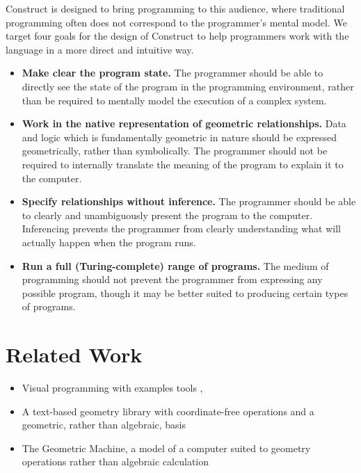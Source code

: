\documentclass[twoside,openright,11pt]{report}
\begin{document}
Construct is designed to bring programming to this audience, where traditional programming often does not correspond to the programmer's mental model.
We target four goals for the design of Construct to help programmers work with the language in a more direct and intuitive way.

\newcommand{\constructgoalsclear}{Make clear the program state}
\newcommand{\constructgoalsnative}{Work in the native representation of geometric relationships}
\newcommand{\constructgoalsnoinfer}{Specify relationships without inference}
\newcommand{\constructgoalscomplete}{Run a full (Turing-complete) range of programs}

\begin{itemize}
  \item {\bf \constructgoalsclear.} 
        The programmer should be able to directly see the state of the program in the programming environment, rather than be required to mentally model the execution of a complex system.
  \item {\bf \constructgoalsnative.} 
        Data and logic which is fundamentally geometric in nature should be expressed geometrically, rather than symbolically. 
        The programmer should not be required to internally translate the meaning of the program to explain it to the computer.
  \item {\bf \constructgoalsnoinfer.} 
        The programmer should be able to clearly and unambiguously present the program to the computer. 
        Inferencing prevents the programmer from clearly understanding what will actually happen when the program runs.
  \item {\bf \constructgoalscomplete.} 
        The medium of programming should not prevent the programmer from expressing any possible program, though it may be better suited to producing certain types of programs.
\end{itemize}

\section{Related Work}
\label{sec:related}

\begin{itemize}
  \item Visual programming with examples tools \cite{victor2013unthinkable}, \cite{victor2013deadfish}
  \item A text-based geometry library with coordinate-free operations and a geometric, rather than algebraic, basis \cite{derose1989coordinatefree}
  \item The Geometric Machine, a model of a computer suited to geometry operations rather than algebraic calculation \cite{reiser2003programming}
\end{itemize}
\end{document}
